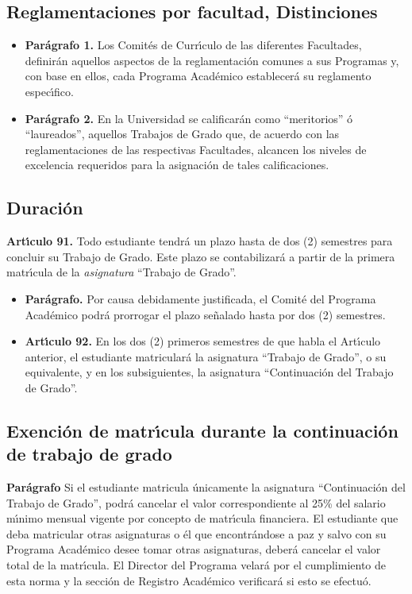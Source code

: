 \subsection{Reglamentaciones por facultad, Distinciones}

\begin{itemize}
\item \textbf{ Par\'{a}grafo 1.} Los Comit\'{e}s de Curr\'{\i}culo de las diferentes
Facultades, definir\'{a}n aquellos aspectos de la reglamentaci\'{o}n
comunes a sus Programas y, con base en ellos, cada Programa
Acad\'{e}mico establecer\'{a} su reglamento espec\'{\i}fico.

\item \textbf{Par\'{a}grafo 2.} En la Universidad se calificar\'{a}n como ``meritorios'' \'{o} ``laureados'', aquellos Trabajos de Grado que, de acuerdo con las
reglamentaciones de las respectivas Facultades, alcancen los
niveles de excelencia requeridos para la asignaci\'{o}n de tales
calificaciones.
\end{itemize}

\subsection{Duraci\'{o}n}
\textbf{Art\'{\i}culo 91.} Todo estudiante tendr\'{a} un plazo hasta de dos (2)
semestres para concluir su Trabajo de Grado. Este plazo se
contabilizar\'{a} a partir de la primera matr\'{\i}cula de la \emph{asignatura} ``Trabajo
de Grado''.
\begin{itemize}
\item\textbf{ Par\'{a}grafo.} Por causa debidamente justificada, el Comit\'{e} del
Programa Acad\'{e}mico podr\'{a} prorrogar el plazo se\~{n}alado hasta por
dos (2) semestres.
\item\textbf{ Art\'{\i}culo 92.} En los dos (2) primeros semestres de que habla el
Art\'{\i}culo anterior, el estudiante matricular\'{a} la asignatura ``Trabajo
de Grado'', o su equivalente, y en los subsiguientes, la asignatura
``Continuaci\'{o}n del Trabajo de Grado''.
\end{itemize}

\subsection{Exenci\'{o}n de matr\'{\i}cula durante la continuaci\'{o}n de trabajo de
grado}
\textbf{Par\'{a}grafo} Si el estudiante matricula \'{u}nicamente la asignatura
``Continuaci\'{o}n del Trabajo de Grado'', podr\'{a} cancelar el valor
correspondiente al 25\% del salario m\'{\i}nimo mensual vigente por
concepto de matr\'{\i}cula financiera. El estudiante que deba matricular
otras asignaturas o \'{e}l que encontr\'{a}ndose a paz y salvo con su
Programa Acad\'{e}mico desee tomar otras asignaturas, deber\'{a} cancelar
el valor total de la matr\'{\i}cula. El Director del Programa velar\'{a} por el
cumplimiento de esta norma y la secci\'{o}n de Registro Acad\'{e}mico
verificar\'{a} si esto se efectu\'{o}.


